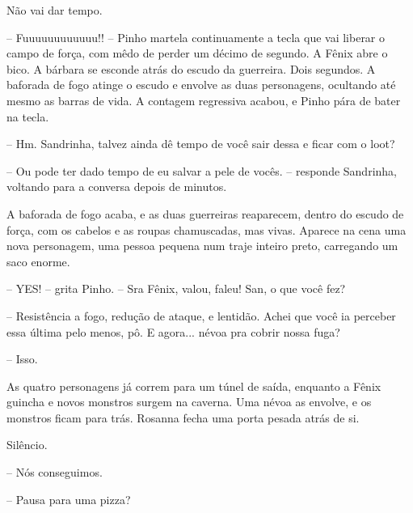 Não vai dar tempo.

-- Fuuuuuuuuuuuu!! -- Pinho martela continuamente a tecla que vai liberar o campo de força, com mêdo de perder um décimo de segundo.
A Fênix abre o bico. A bárbara se esconde atrás do escudo da guerreira. Dois segundos. 
A baforada de fogo atinge o escudo e envolve as duas personagens, ocultando até mesmo as barras de vida.
A contagem regressiva acabou, e Pinho pára de bater na tecla.

-- Hm. Sandrinha, talvez ainda dê tempo de você sair dessa e ficar com o loot?

-- Ou pode ter dado tempo de eu salvar a pele de vocês. -- responde Sandrinha, voltando para a conversa depois de minutos.

A baforada de fogo acaba, e as duas guerreiras reaparecem, dentro do escudo de força, com os cabelos e as roupas chamuscadas, mas vivas.
Aparece na cena uma nova personagem, uma pessoa pequena num traje inteiro preto, carregando um saco enorme.

-- YES! -- grita Pinho. -- Sra Fênix, valou, faleu! San, o que você fez?

-- Resistência a fogo, redução de ataque, e lentidão. Achei que você ia perceber essa última pelo menos, pô. E agora... névoa pra cobrir nossa fuga?

-- Isso.

As quatro personagens já correm para um túnel de saída, enquanto a Fênix guincha e novos monstros surgem na caverna.
Uma névoa as envolve, e os monstros ficam para trás.
Rosanna fecha uma porta pesada atrás de si.

Silêncio.

-- Nós conseguimos.

-- Pausa para uma pizza?

